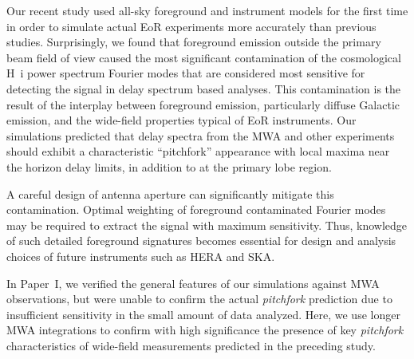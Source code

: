 \documentclass[preprint2,apjl,numberedappendix,twocolappendix,appendixfloats]{emulateapj}
\begin{document}

Our recent study \citep[][hereafter referred to as Paper~I]{thy15} used all-sky foreground and instrument models for the first time in order to simulate actual EoR experiments more accurately than previous studies. Surprisingly, we found that foreground emission outside the primary beam field of view caused the most significant contamination of the cosmological H~{\sc i} power spectrum Fourier modes that are considered most sensitive for detecting the signal in delay spectrum based analyses. This contamination is the result of the interplay between foreground emission, particularly diffuse Galactic emission, and the wide-field properties typical of EoR instruments. Our simulations predicted that delay spectra from the MWA and other experiments should exhibit a characteristic ``pitchfork'' appearance with local maxima near the horizon delay limits, in addition to at the primary lobe region.  

A careful design of antenna aperture can significantly mitigate this contamination. Optimal weighting of foreground contaminated Fourier modes may be required to extract the signal with maximum sensitivity. Thus, knowledge of such detailed foreground signatures becomes essential for design and analysis choices of future instruments such as HERA and SKA.

In Paper~I, we verified the general features of our simulations against MWA observations, but were unable to confirm the actual {\it pitchfork} prediction due to insufficient sensitivity in the small amount of data analyzed. Here, we use longer MWA integrations to confirm with high significance the presence of key {\it pitchfork} characteristics of wide-field measurements predicted in the preceding study.  
\end{document}
